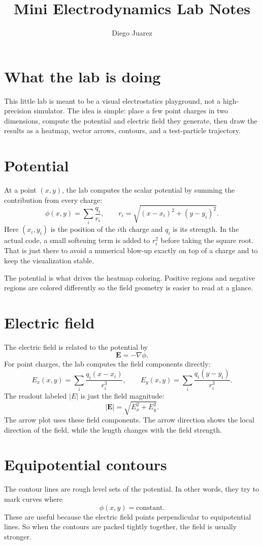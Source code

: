 \documentclass[11pt]{article}
\title{Mini Electrodynamics Lab Notes}
\author{Diego Juarez}
\date{}
\begin{document}
\maketitle

\section*{What the lab is doing}
This little lab is meant to be a visual electrostatics playground, not a high-precision simulator. The idea is simple: place a few point charges in two dimensions, compute the potential and electric field they generate, then draw the results as a heatmap, vector arrows, contours, and a test-particle trajectory.

\section*{Potential}
At a point $(x,y)$, the lab computes the scalar potential by summing the contribution from every charge:
\[
\phi(x,y) = \sum_i \frac{q_i}{r_i},
\qquad
r_i = \sqrt{(x-x_i)^2 + (y-y_i)^2}.
\]
Here $(x_i,y_i)$ is the position of the $i$th charge and $q_i$ is its strength. In the actual code, a small softening term is added to $r_i^2$ before taking the square root. That is just there to avoid a numerical blow-up exactly on top of a charge and to keep the visualization stable.

The potential is what drives the heatmap coloring. Positive regions and negative regions are colored differently so the field geometry is easier to read at a glance.

\section*{Electric field}
The electric field is related to the potential by
\[
\mathbf{E} = -\nabla \phi.
\]
For point charges, the lab computes the field components directly:
\[
E_x(x,y) = \sum_i \frac{q_i(x-x_i)}{r_i^3},
\qquad
E_y(x,y) = \sum_i \frac{q_i(y-y_i)}{r_i^3}.
\]
The readout labeled $|E|$ is just the field magnitude:
\[
|\mathbf{E}| = \sqrt{E_x^2 + E_y^2}.
\]
The arrow plot uses these field components. The arrow direction shows the local direction of the field, while the length changes with the field strength.

\section*{Equipotential contours}
The contour lines are rough level sets of the potential. In other words, they try to mark curves where
\[
\phi(x,y) = \text{constant}.
\]
These are useful because the electric field points perpendicular to equipotential lines. So when the contours are packed tightly together, the field is usually stronger.
\end{document}
